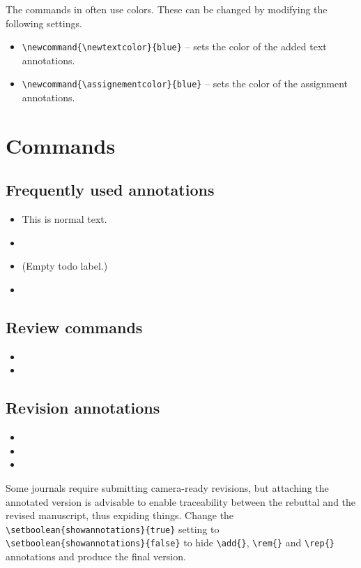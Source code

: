 \documentclass{article}
\begin{document}
The commands in  often use colors. These can be changed by modifying the following settings.
\begin{itemize}
    \item \verb|\newcommand{\newtextcolor}{blue}| -- sets the color of the added text annotations.
    \item \verb|\newcommand{\assignementcolor}{blue}| -- sets the color of the assignment annotations.
\end{itemize}





\section{Commands}\label{sec:commands}

\subsection{Frequently used annotations}

\begin{itemize}
    \item This is normal text.
    \item {}
    \item \todo{} (Empty todo label.)
    \item {}
\end{itemize}

\subsection{Review commands}

\begin{itemize}
    \item {}
    \item {}
\end{itemize}

\subsection{Revision annotations}

\begin{itemize}
    \item {}
    \item {}
    \item {}
\end{itemize}

Some journals require submitting camera-ready revisions, but attaching the annotated version is advisable to enable traceability between the rebuttal and the revised manuscript, thus expiding things. Change the \verb|\setboolean{showannotations}{true}| setting to \verb|\setboolean{showannotations}{false}| to hide \verb|\add{}|, \verb|\rem{}| and \verb|\rep{}| annotations and produce the final version.
\end{document}
